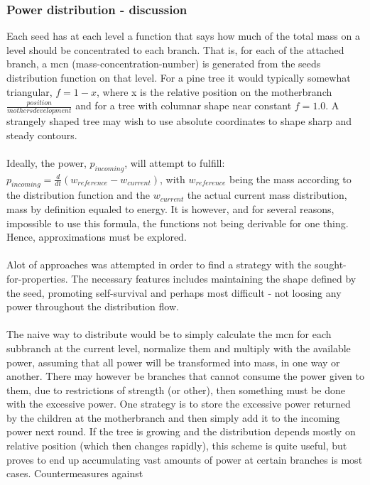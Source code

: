 \subsubsection{Power distribution - discussion}
Each seed has at each level a function that says how much of the total
mass on a level should be concentrated to each branch. That is, for each of
the attached branch, a mcn (mass-concentration-number) is generated from the
seeds distribution function on that level. For a pine tree it
would typically somewhat triangular, $f = 1 - x$, where x is the relative
position on the motherbranch $\frac{position}{mothers development}$ and for a tree 
with columnar shape near
constant $f = 1.0$. A strangely shaped tree may wish to use absolute coordinates
to shape sharp and steady contours.
\\\\
Ideally, the power, $p_{incoming}$, will attempt to fulfill:
$p_{incoming}=\frac{d}{dt}(w_{reference} - w_{current})$, with $w_{reference}$
being the mass according to the distribution function and the $w_{current}$
the actual current mass distribution, mass by definition equaled to energy. 
It is however, and for several reasons, impossible to use this formula, the 
functions not being derivable for one thing. Hence, approximations must be
explored.
\\\\
Alot of approaches was attempted in order to find a strategy with the sought-
for-properties. The necessary features includes maintaining the shape defined
by the seed, promoting self-survival and perhaps most difficult - not loosing
any power throughout the distribution flow. 
\\\\
The naive way to distribute would be to simply calculate the
mcn for each subbranch at the current level,
normalize them and multiply with the available power, assuming that all power
will be transformed into mass, in one way or another. There may however be
branches that cannot consume the power given to them, due to restrictions of
strength (or other), then something must be done with the excessive power. 
One strategy is to store the excessive power returned by the children at the 
motherbranch and then simply add it to the incoming power next round. If the 
tree is growing and the distribution depends mostly on relative position (which 
then changes rapidly), this scheme is quite useful, but proves to end up 
accumulating vast 
amounts of power at certain branches is most cases. Countermeasures against
